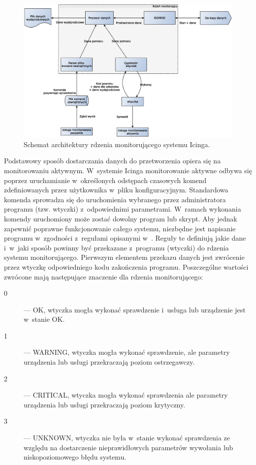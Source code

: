 \begin{figure}[ht]
  \caption{Schemat architektury rdzenia monitorującego systemu
    Icinga.}
  \label{fig:icingaCoreArch}
\includegraphics[width=1\textwidth]{img/icingaCoreArch}
\end{figure}


Podstawowy sposób dostarczania danych do przetworzenia opiera się na
monitorowaniu aktywnym. W~systemie Icinga monitorowanie aktywne odbywa
się poprzez uruchamianie w~określonych odstępach czasowych komend
zdefiniowanych przez użytkownika w~pliku konfiguracyjnym. Standardowa
komenda sprowadza się do uruchomienia wybranego przez administratora
programu (tzw. wtyczki) z~odpowiednimi parametrami. W~ramach wykonania
komendy uruchomiony może zostać dowolny program lub skrypt. Aby jednak
zapewnić poprawne funkcjonowanie całego systemu, niezbędne jest
napisanie programu w~zgodności z~regułami opisanymi
w~\cite{www:NagiosPluginsTutorial}. Reguły te definiują jakie dane
i~w~jaki sposób powinny być przekazane z~programu (wtyczki) do rdzenia
systemu monitorującego. Pierwszym elementem przekazu danych jest
zwrócenie przez wtyczkę odpowiedniego kodu zakończenia
programu. Poszczególne wartości zwrócone mają następujące znaczenie
dla rdzenia monitorującego:

\begin{description}
\item[0] --- OK, wtyczka mogła wykonać sprawdzenie i~usługa lub urządzenie
  jest w~stanie OK.
\item[1] --- WARNING, wtyczka mogła wykonać sprawdzenie, ale parametry
  urządzenia lub usługi przekraczają poziom ostrzegawczy.
\item[2] --- CRITICAL, wtyczka mogła wykonać sprawdzenia ale parametry
  urządzenia lub usługi przekraczają poziom krytyczny.
\item[3] --- UNKNOWN, wtyczka nie była w~stanie wykonać sprawdzenia ze
  względu na dostarczenie nieprawidłowych parametrów wywołania lub
  niskopoziomowego błędu systemu.
\end{description}

